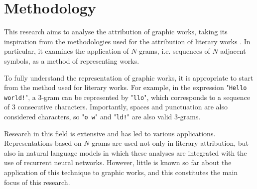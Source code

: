 \chapter{Methodology}
\label{chap:methodology}
This research aims to analyse the attribution of graphic works, taking its inspiration from the methodologies used for the attribution of literary works \citep[see][]{thesis}. In particular, it examines the application of $N$-grams, i.e. sequences of $N$ adjacent symbols, as a method of representing works.

\noindent To fully understand the representation of graphic works, it is appropriate to start from the method used for literary works. For example, in the expression "\texttt{Hello world!}", a $3$-gram can be represented by "\texttt{llo}", which corresponds to a sequence of $3$ consecutive characters. Importantly, spaces and punctuation are also considered characters, so "\texttt{o w}" and "\texttt{ld!}" are also valid $3$-grams.

\noindent Research in this field is extensive and has led to various applications. Representations based on $N$-grams are used not only in literary attribution, but also in natural language models in which these analyses are integrated with the use of recurrent neural networks. However, little is known so far about the application of this technique to graphic works, and this constitutes the main focus of this research.

